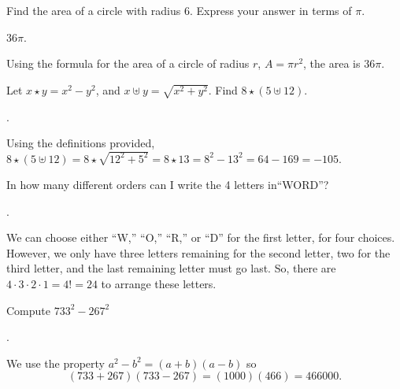 \documentclass[11pt]{article}
\begin{document}
\begin{problem}Find the area of a circle with radius 6. Express your answer in terms of $\pi$.
\end{problem}

\answer $36\pi$.
\begin{solution}
Using the formula for the area of a circle of radius $r$, $A = \pi r^2$, the area is $\boxed{36 \pi}$.
\end{solution}

\begin{problem} Let $x \star y = x^2 - y^2$, and $x \uplus y = \sqrt{x^2 + y^2}$. Find $8 \star (5 \uplus 12)$.
\end{problem}

.
\begin{solution}
Using the definitions provided, $8 \star (5 \uplus 12) = 8 \star \sqrt{12^2 + 5^2} = 8 \star 13 = 8^2 - 13^2 = 64 - 169 = \boxed{-105}.$
\end{solution}

\begin{problem}In how many different orders can I write the 4 letters in``WORD''?
\end{problem}

.
\begin{solution}
We can choose either ``W,'' ``O,'' ``R,'' or ``D'' for the first letter, for four choices. However, we only have three letters remaining for the second letter, two for the third letter, and the last remaining letter must go last. So, there are $4 \cdot 3 \cdot 2 \cdot 1 = 4! = \boxed{24}$ to arrange these letters.
\end{solution}


\begin{problem}
Compute $733^2-267^2$
\end{problem}
\begin{answer}
.
\end{answer}
\begin{solution}
We use the property $a^2-b^2 = (a+b)(a-b)$ so
$$(733+267)(733-267) = (1000)(466) = \boxed{466000}.$$
\end{solution}
\end{document}
